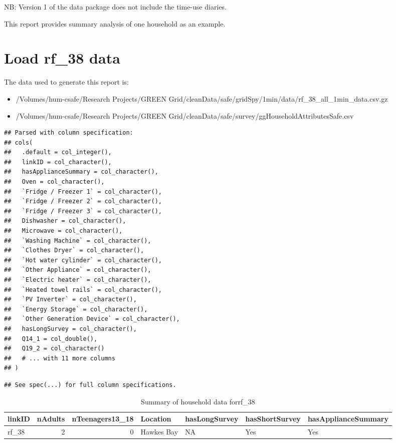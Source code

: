 \documentclass[]{article}
\providecommand{\tightlist}{%
  \setlength{\itemsep}{0pt}\setlength{\parskip}{0pt}}
\theoremstyle{definition}
\theoremstyle{definition}
\theoremstyle{definition}
\theoremstyle{remark}
\begin{document}
NB: Version 1 of the data package does not include the time-use diaries.

This report provides summary analysis of one household as an example.

\section{Load rf\_38 data}\label{load-rf_38-data}

The data used to generate this report is:

\begin{itemize}
\tightlist
\item
  /Volumes/hum-csafe/Research Projects/GREEN
  Grid/cleanData/safe/gridSpy/1min/data/rf\_38\_all\_1min\_data.csv.gz
\item
  /Volumes/hum-csafe/Research Projects/GREEN
  Grid/cleanData/safe/survey/ggHouseholdAttributesSafe.csv
\end{itemize}

\begin{verbatim}
## Parsed with column specification:
## cols(
##   .default = col_integer(),
##   linkID = col_character(),
##   hasApplianceSummary = col_character(),
##   Oven = col_character(),
##   `Fridge / Freezer 1` = col_character(),
##   `Fridge / Freezer 2` = col_character(),
##   `Fridge / Freezer 3` = col_character(),
##   Dishwasher = col_character(),
##   Microwave = col_character(),
##   `Washing Machine` = col_character(),
##   `Clothes Dryer` = col_character(),
##   `Hot water cylinder` = col_character(),
##   `Other Appliance` = col_character(),
##   `Electric heater` = col_character(),
##   `Heated towel rails` = col_character(),
##   `PV Inverter` = col_character(),
##   `Energy Storage` = col_character(),
##   `Other Generation Device` = col_character(),
##   hasLongSurvey = col_character(),
##   Q14_1 = col_double(),
##   Q19_2 = col_character()
##   # ... with 11 more columns
## )
\end{verbatim}

\begin{verbatim}
## See spec(...) for full column specifications.
\end{verbatim}

\begin{table}

\caption{\label{tab:hhData}Summary of household data forrf_38}
\centering
\begin{tabular}[t]{lrrllll}
\toprule
linkID & nAdults & nTeenagers13\_18 & Location & hasLongSurvey & hasShortSurvey & hasApplianceSummary\\
\midrule
rf\_38 & 2 & 0 & Hawkes Bay & NA & Yes & Yes\\
\bottomrule
\end{tabular}
\end{table}
\end{document}
